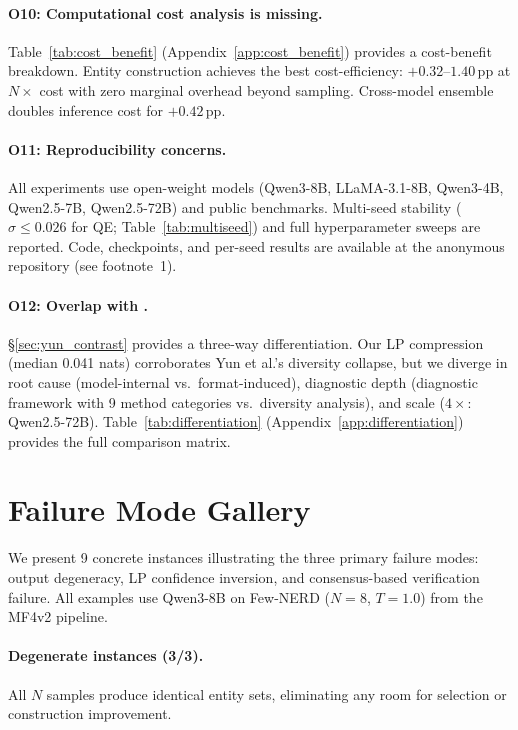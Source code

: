 \paragraph{O10: Computational cost analysis is missing.}
Table~\ref{tab:cost_benefit} (Appendix~\ref{app:cost_benefit}) provides a cost-benefit breakdown. Entity construction achieves the best cost-efficiency: $+0.32$--$1.40$\,pp at $N{\times}$ cost with zero marginal overhead beyond sampling. Cross-model ensemble doubles inference cost for $+0.42$\,pp.

\paragraph{O11: Reproducibility concerns.}
All experiments use open-weight models (Qwen3-8B, LLaMA-3.1-8B, Qwen3-4B, Qwen2.5-7B, Qwen2.5-72B) and public benchmarks. Multi-seed stability ($\sigma{\leq}0.026$ for QE; Table~\ref{tab:multiseed}) and full hyperparameter sweeps are reported. Code, checkpoints, and per-seed results are available at the anonymous repository (see footnote~1).

\paragraph{O12: Overlap with \citet{yun2025price}.}
\S\ref{sec:yun_contrast} provides a three-way differentiation. Our LP compression (median 0.041 nats) corroborates Yun et al.'s diversity collapse, but we diverge in root cause (model-internal vs.\ format-induced), diagnostic depth (diagnostic framework with 9 method categories vs.\ diversity analysis), and scale ($4{\times}$: Qwen2.5-72B). Table~\ref{tab:differentiation} (Appendix~\ref{app:differentiation}) provides the full comparison matrix.

\section{Failure Mode Gallery}\label{app:failure_gallery}

We present 9 concrete instances illustrating the three primary failure modes: output degeneracy, LP confidence inversion, and consensus-based verification failure. All examples use Qwen3-8B on Few-NERD ($N{=}8$, $T{=}1.0$) from the MF4v2 pipeline.

\paragraph{Degenerate instances (3/3).}
All $N$ samples produce identical entity sets, eliminating any room for selection or construction improvement.

